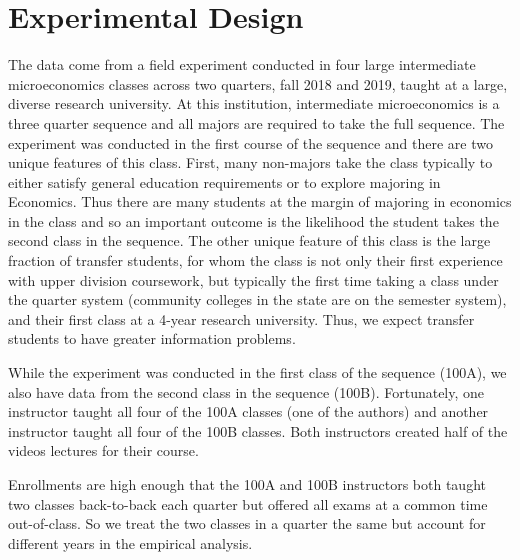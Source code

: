 \documentclass[12pt]{article}
\begin{document}

\section{Experimental Design} \label{expdesign}
The data come from a field experiment conducted in four large intermediate microeconomics classes across two quarters, fall 2018 and 2019, taught at a large, diverse research university.  At this institution, intermediate microeconomics is a three quarter sequence and all majors are required to take the full sequence. The experiment was conducted in the first course of the sequence and there are two unique features of this class.  First, many non-majors take the class typically to either satisfy general education requirements or to explore majoring in Economics.  Thus there are many students at the margin of majoring in economics in the class and so an important outcome is the likelihood the student takes the second class in the sequence.  The other unique feature of this class is the large fraction of transfer students, for whom the class is not only their first experience with upper division coursework, but typically the first time taking a class under the quarter system (community colleges in the state are on the semester system), and their first class at a 4-year research university.  Thus, we expect transfer students to have greater information problems. 

While the experiment was conducted in the first class of the sequence (100A), we also have data from the second class in the sequence (100B).  Fortunately, one instructor taught all four of the 100A classes (one of the authors) and another instructor taught all four of the 100B classes.  Both instructors created half of the videos lectures for their course.  

Enrollments are high enough that the 100A and 100B instructors both taught two classes back-to-back each quarter but offered all exams at a common time out-of-class.  So we treat the two classes in a quarter the same but account for different years in the empirical analysis.  
\end{document}
